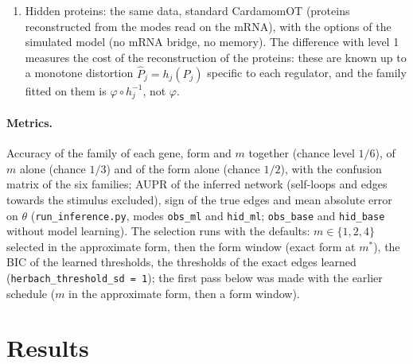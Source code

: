 \documentclass[a4paper, 11pt]{article}
\theoremstyle{plain}
\theoremstyle{remark}
\begin{document}
\begin{enumerate}[nosep]
\emph{Proliferation.} The observed cells sample the branched population, the model describes the SDE without branching: each cell is weighted by $w = \mathbb{E}[e^{-\int R}]$ along its lineage, the inverse of the branching of the simulations, by recursion between consecutive timepoints with ancestors drawn by a Gaussian kernel on the proteins, $p(i\mid j) \propto e^{R_i\Delta t/2 - |P_i - P_j|^2/2h^2}$, and $w_j = \sum_i p(i\mid j)\, w_i\, e^{-(R_i + R_j)\Delta t/2}$. The scale is fitted without the weights, then with them, and the final weights (on the rescaled proteins) resample the states of the later steps (refine, simulations). The benchmark has no proliferation (weights 1).
\item Hidden proteins: the same data, standard CardamomOT (proteins reconstructed from the modes read on the mRNA), with the options of the simulated model (no mRNA bridge, no memory). The difference with level 1 measures the cost of the reconstruction of the proteins: these are known up to a monotone distortion $\hat P_j = h_j(P_j)$ specific to each regulator, and the family fitted on them is $\varphi\circ h_j^{-1}$, not $\varphi$.
\end{enumerate}

\paragraph{Metrics.} Accuracy of the family of each gene, form and $m$ together (chance level $1/6$), of $m$ alone (chance $1/3$) and of the form alone (chance $1/2$), with the confusion matrix of the six families; AUPR of the inferred network (self-loops and edges towards the stimulus excluded), sign of the true edges and mean absolute error on $\theta$ (\texttt{run\_inference.py}, modes \texttt{obs\_ml} and \texttt{hid\_ml}; \texttt{obs\_base} and \texttt{hid\_base} without model learning). The selection runs with the defaults: $m \in \{1, 2, 4\}$ selected in the approximate form, then the form window (exact form at $m^*$), the BIC of the learned thresholds, the thresholds of the exact edges learned (\texttt{herbach\_threshold\_sd = 1}); the first pass below was made with the earlier schedule ($m$ in the approximate form, then a form window).

\section{Results}\label{sec:results}
\end{document}
